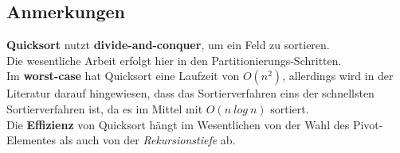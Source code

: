 \subsection{Anmerkungen}
\textbf{Quicksort} nutzt \textbf{divide-and-conquer}, um ein Feld zu sortieren.\\
Die wesentliche Arbeit erfolgt hier in den Partitionierungs-Schritten.\\

\noindent
Im \textbf{worst-case} hat Quicksort eine Laufzeit von $O(n^2)$, allerdings wird in der Literatur darauf hingewiesen, dass das Sortierverfahren eins der schnellsten Sortierverfahren ist, da es im Mittel mit $O(n\ log\ n)$ sortiert.\\
Die \textbf{Effizienz} von Quicksort hängt im Wesentlichen von der Wahl des Pivot-Elementes als auch von der \textit{Rekursionstiefe} ab.